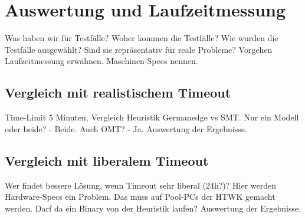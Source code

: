\chapter{Auswertung und Laufzeitmessung}

Was haben wir für Testfälle?
Woher kommen die Testfälle?
Wie wurden die Testfälle ausgewählt?
Sind sie repräsentativ für reale Probleme?
Vorgehen Laufzeitmessung erwähnen.
Maschinen-Specs nennen.

\section{Vergleich mit realistischem Timeout}
Time-Limit 5 Minuten, Vergleich Heuristik Germanedge vs SMT.
Nur ein Modell oder beide? - Beide.
Auch OMT? - Ja.
Auswertung der Ergebnisse.

\section{Vergleich mit liberalem Timeout}
Wer findet bessere Lösung, wenn Timeout sehr liberal (24h?)?
Hier werden Hardware-Specs ein Problem.
Das muss auf Pool-PCs der HTWK gemacht werden.
Darf da ein Binary von der Heuristik laufen?
Auswertung der Ergebnisse.
